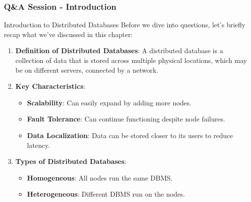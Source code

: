 \documentclass[aspectratio=169]{beamer}
\begin{document}
\begin{frame}[fragile]
  \frametitle{Q\&A Session - Introduction}
  \begin{block}{Introduction to Distributed Databases}
    Before we dive into questions, let’s briefly recap what we’ve discussed in this chapter:
  \end{block}

  \begin{enumerate}
    \item \textbf{Definition of Distributed Databases}: A distributed database is a collection of data that is stored across multiple physical locations, which may be on different servers, connected by a network.
    
    \item \textbf{Key Characteristics}:
    \begin{itemize}
      \item \textbf{Scalability}: Can easily expand by adding more nodes.
      \item \textbf{Fault Tolerance}: Can continue functioning despite node failures.
      \item \textbf{Data Localization}: Data can be stored closer to its users to reduce latency.
    \end{itemize}

    \item \textbf{Types of Distributed Databases}:
    \begin{itemize}
      \item \textbf{Homogeneous}: All nodes run the same DBMS.
      \item \textbf{Heterogeneous}: Different DBMS run on the nodes.
    \end{itemize}
  \end{enumerate}
\end{frame}
\end{document}
